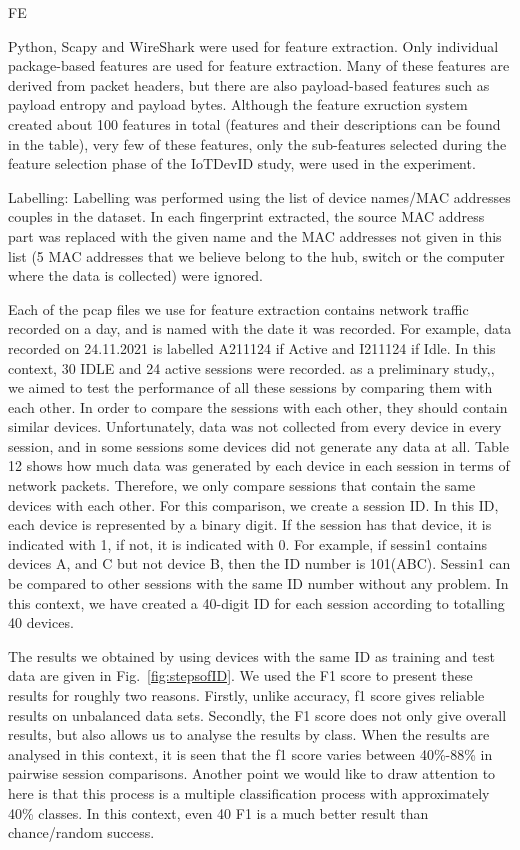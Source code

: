 \documentclass[journal]{IEEEtran}
\begin{document}
FE

Python, Scapy and WireShark were used for feature extraction. Only individual package-based features are used for feature extraction. Many of these features are derived from packet headers, but there are also payload-based features such as payload entropy and payload bytes. Although the feature exruction system created about 100 features in total (features and their descriptions can be found in the table), very few of these features, only the sub-features selected during the feature selection phase of the IoTDevID study, were used in the experiment.


Labelling:
Labelling was performed using the list of device names/MAC addresses couples in the dataset. In each fingerprint extracted, the source MAC address part was replaced with the given name and the MAC addresses not given in this list (5 MAC addresses that we believe belong to the hub, switch or the computer where the data is collected) were ignored.



Each of the pcap files we use for feature extraction contains network traffic recorded on a day, and is named with the date it was recorded.   For example, data recorded on 24.11.2021 is labelled A211124 if Active and I211124 if Idle. In this context, 30 IDLE and 24 active sessions were recorded. as a preliminary study,, we aimed to test the performance of all these sessions by comparing them with each other. In order to compare the sessions with each other, they should contain similar devices. Unfortunately, data was not collected from every device in every session, and in some sessions some devices did not generate any data at all. Table 12 shows how much data was generated by each device in each session in terms of network packets. Therefore, we only compare sessions that contain the same devices with each other. For this comparison, we create a session ID. In this ID, each device is represented by a binary digit. If the session has that device, it is indicated with 1, if not, it is indicated with 0. For example, if sessin1 contains devices A, and C but not device B, then the ID number is 101(ABC). Sessin1 can be compared to other sessions with the same ID number without any problem. In this context, we have created a 40-digit ID for each session according to totalling 40 devices.



The results we obtained by using devices with the same ID as training and test data are given in Fig.~\ref{fig:stepsofID}.  We used the F1 score to present these results for roughly two reasons. Firstly, unlike accuracy, f1 score gives reliable results on unbalanced data sets. Secondly, the F1 score does not only give overall results, but also allows us to analyse the results by class. When the results are analysed in this context, it is seen that the f1 score varies between 40\%-88\% in pairwise session comparisons. Another point we would like to draw attention to here is that this process is a multiple classification process with approximately 40\% classes. In this context, even 40 F1 is a much better result than chance/random success.
\end{document}
